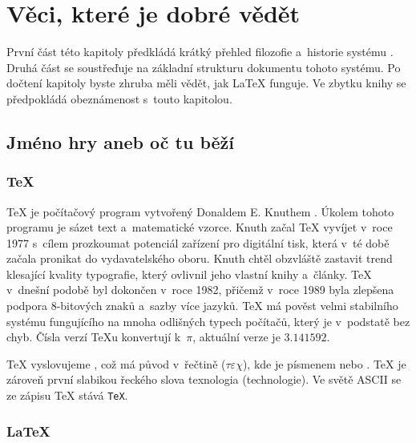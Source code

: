  
\chapter{Věci, které je dobré vědět}
\begin{intro}
První část této kapitoly předkládá krátký přehled filozofie a~historie
systému \LaTeXe. Druhá část se soustřeďuje na základní strukturu dokumentu
tohoto systému. Po dočtení kapitoly byste zhruba měli vědět,
jak \LaTeX{} funguje. Ve zbytku knihy se předpokládá obeznámenost s~touto
kapitolou.
\end{intro}

\section{Jméno hry aneb oč tu běží}
\subsection{\TeX}
 
\TeX{} je počítačový program vytvořený Donaldem
E. Knuthem \cite{texbook}. Úkolem tohoto programu je sázet text
a~matematické vzorce. Knuth začal \TeX{} vyvíjet
v~roce 1977 s~cílem prozkoumat potenciál zařízení pro digitální tisk, která
v~té době začala pronikat do vydavatelského oboru. Knuth chtěl
obzvláště zastavit trend klesající kvality typografie, který ovlivnil
jeho vlastní knihy a~články. \TeX{} v~dnešní podobě byl dokončen
v~roce 1982, přičemž v~roce 1989 byla zlepšena podpora 8-bitových znaků
a~sazby více jazyků. \TeX{} má pověst velmi stabilního systému
fungujícího na mnoha odlišných typech počítačů, který je v~podstatě bez chyb.
Čísla verzí \TeX u konvertují k~$\pi$, aktuální verze je $3.141592$.

\TeX{} vyslovujeme , což má původ v~řečtině ($\tau\varepsilon\chi$), kde 
je písmenem  nebo . \TeX{} je zároveň první slabikou
řeckého slova texnologia (technologie). Ve světě ASCII se ze zápisu \TeX{}
stává \texttt{TeX}.

\subsection{\LaTeX}

